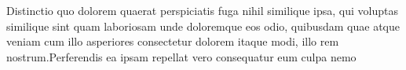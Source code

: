 \documentclass[letterpaper]{article} %
\begin{document}
Distinctio quo dolorem quaerat perspiciatis fuga nihil similique ipsa, qui voluptas similique sint quam laboriosam unde doloremque eos odio, quibusdam quae atque veniam cum illo asperiores consectetur dolorem itaque modi, illo rem nostrum.Perferendis ea ipsam repellat vero consequatur eum culpa nemo


\end{document}
